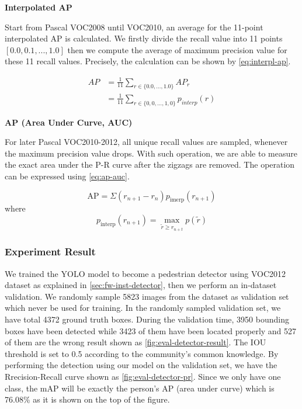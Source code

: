 \noindent \textbf{Interpolated AP}

\noindent Start from Pascal VOC2008 until VOC2010, an average for the 11-point
interpolated AP is calculated. We firstly divide the recall value into 11 points
$[0.0, 0.1, ..., 1.0]$ then we compute the average of maximum precision value
for these 11 recall values. Precisely, the calculation can be shown by
\autoref{eq:interpl-ap}.

\begin{equation}
\label{eq:interpl-ap}
\begin{aligned} A P &=\frac{1}{11} \sum_{r \in\{0.0, \ldots, 1.0\}} A P_{r} \\
&=\frac{1}{11} \sum_{r \in\{0,0, \ldots, 1,0\}} p_{i n t e r p}(r) \end{aligned}
\end{equation}

\noindent \textbf{AP (Area Under Curve, AUC)}

\noindent For later Pascal VOC2010-2012, all unique recall values are sampled,
whenever the maximum precision value drops. With such operation, we are able to
measure the exact area under the P-R curve after the zigzags are removed. The
operation can be expressed using \autoref{eq:ap-auc}.

\begin{equation}
\label{eq:ap-auc}
\mathrm{AP}=\Sigma\left(r_{n+1}-r_{n}\right) p_{\text
    {imerp}}\left(r_{n+1}\right)
\end{equation}
\noindent where
$$
p_{\text {interp}}
\left(r_{n+1}
\right)=\max _{\tilde{r} \geq r_{n+t}} p(\widetilde{r})
$$

\subsubsection{Experiment Result}
\label{sec:Eval-detection-result}

We trained the YOLO model to become a pedestrian detector using VOC2012 dataset
as explained in \autoref{sec:fw-inst-detector}, then we perform an in-dataset
validation. We randomly sample 5823 images from the dataset as validation set
which never be used for training.
In the randomly sampled validation set, we have total 4372
ground truth boxes. During the validation time, 3950 bounding boxes have been
detected while 3423 of them have been located properly and 527 of them are
the wrong result shown as \autoref{fig:eval-detector-result}. The IOU threshold is
set to 0.5 according to the community's common knowledge.
By performing the detection using our model on the validation set, we have the
Rrecision-Recall curve shown as \autoref{fig:eval-detector-pr}. Since we only
have one class, the mAP will be exactly the person's AP (area under curve)
which is 76.08\% as it is shown on the top of the figure.

